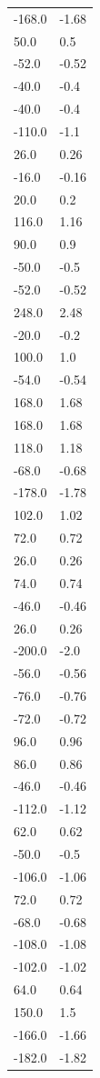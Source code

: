 \begin{longtable}{ll}
-168.0 & -1.68 \\
50.0 & 0.5 \\
-52.0 & -0.52 \\
-40.0 & -0.4 \\
-40.0 & -0.4 \\
-110.0 & -1.1 \\
26.0 & 0.26 \\
-16.0 & -0.16 \\
20.0 & 0.2 \\
116.0 & 1.16 \\
90.0 & 0.9 \\
-50.0 & -0.5 \\
-52.0 & -0.52 \\
248.0 & 2.48 \\
-20.0 & -0.2 \\
100.0 & 1.0 \\
-54.0 & -0.54 \\
168.0 & 1.68 \\
168.0 & 1.68 \\
118.0 & 1.18 \\
-68.0 & -0.68 \\
-178.0 & -1.78 \\
102.0 & 1.02 \\
72.0 & 0.72 \\
26.0 & 0.26 \\
74.0 & 0.74 \\
-46.0 & -0.46 \\
26.0 & 0.26 \\
-200.0 & -2.0 \\
-56.0 & -0.56 \\
-76.0 & -0.76 \\
-72.0 & -0.72 \\
96.0 & 0.96 \\
86.0 & 0.86 \\
-46.0 & -0.46 \\
-112.0 & -1.12 \\
62.0 & 0.62 \\
-50.0 & -0.5 \\
-106.0 & -1.06 \\
72.0 & 0.72 \\
-68.0 & -0.68 \\
-108.0 & -1.08 \\
-102.0 & -1.02 \\
64.0 & 0.64 \\
150.0 & 1.5 \\
-166.0 & -1.66 \\
-182.0 & -1.82 \\

\end{longtable}
